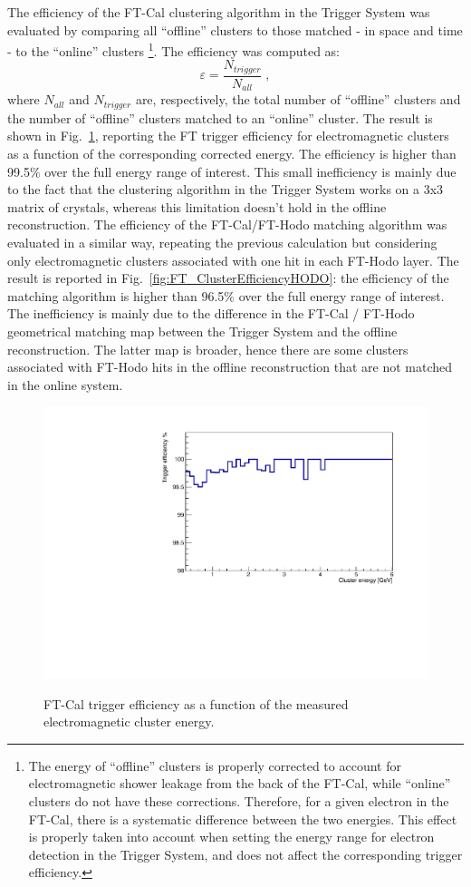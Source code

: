 The efficiency of the FT-Cal clustering algorithm in the Trigger System was evaluated by comparing all ``offline'' clusters to those matched - in space and time - to the ``online'' clusters \footnote{The energy of ``offline'' clusters is properly corrected to account for electromagnetic shower leakage from the back of the FT-Cal, while ``online'' clusters do not have these corrections. Therefore, for a given electron in the FT-Cal, there is a systematic difference between the two energies. This effect is properly taken into account when setting the energy range for electron detection in the Trigger System, and does not affect the corresponding trigger efficiency.}. The efficiency was computed as:
\begin{equation}
\varepsilon=\frac{N_{trigger}}{N_{all}} \; ,
\end{equation}
where $N_{all}$ and $N_{trigger}$ are, respectively, the total number of ``offline'' clusters and the number of ``offline'' clusters matched to an ``online'' cluster. The result is shown in Fig.~\ref{fig:FT_ClusterEfficiency}, reporting the FT trigger efficiency for electromagnetic clusters as a function of the corresponding corrected energy. The efficiency is higher than 99.5$\%$ over the full energy range of interest. This small inefficiency is mainly due to the fact that the clustering algorithm in the Trigger System works on a 3x3 matrix of crystals, whereas this limitation doesn't hold in the offline reconstruction.
The efficiency of the FT-Cal/FT-Hodo matching algorithm was evaluated in a similar way, repeating the previous calculation but considering only electromagnetic clusters associated with one hit in each FT-Hodo layer. 
The result is reported in Fig.~\ref{fig:FT_ClusterEfficiencyHODO}: the efficiency of the matching algorithm is higher than 96.5$\%$  over the full energy range of interest. The inefficiency is mainly due to the difference in the FT-Cal / FT-Hodo geometrical matching map between the Trigger System and the offline reconstruction. The latter map is broader, hence there are some clusters associated with FT-Hodo hits in the offline reconstruction that are not matched in the online system. 

\begin{figure}[!htb]
 \centering
{\includegraphics[width=.5\textwidth]{img/FT_ClusterEfficiency.pdf}}
 \caption{FT-Cal trigger efficiency as a function of the measured electromagnetic cluster energy.}
 \label{fig:FT_ClusterEfficiency}
\end{figure}

